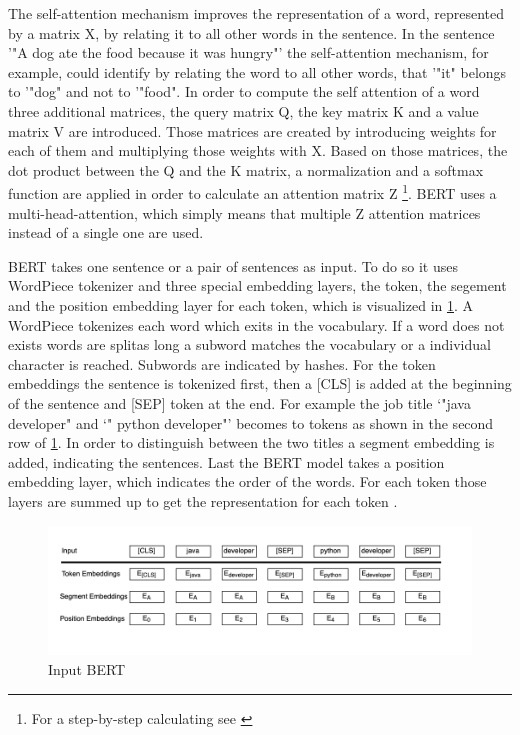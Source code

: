 \documentclass[12pt, a4paper, titlepage]{article}
\begin{document}
The self-attention mechanism improves the representation of a word, represented by a matrix X, by relating it to all other words in the sentence. In the sentence '"A dog ate the food because it was hungry"' \citep[10]{ravichandiran2021} the self-attention mechanism, for example, could identify by relating the word to all other words, that '"it" belongs to '"dog" and not to '"food". 
In order to compute the self attention of a word three additional matrices, the query matrix Q, the key matrix K and a value matrix V are introduced. Those matrices are created by introducing weights for each of them and multiplying those weights with X. Based on those matrices, the dot product between the Q and the K matrix, a normalization and a softmax function are applied in order to calculate an attention matrix Z  \footnote{For a step-by-step calculating see \citep{ravichandiran2021}}. \ac{BERT} uses a multi-head-attention, which simply means that multiple Z attention matrices instead of a single one are used.

\ac{BERT} takes one sentence or a pair of sentences as input. To do so it uses WordPiece tokenizer and three special embedding layers, the token, the segement and the position embedding layer for each token, which is visualized in \ref{fig: F4}. A WordPiece tokenizes each word which exits in the vocabulary. If a word does not exists words are splitas long a subword matches the vocabulary or a individual character is reached. Subwords are indicated by hashes. For the token embeddings the sentence is tokenized first, then a [CLS] is added at the beginning of the sentence and [SEP] token at the end. For example the job title `"java developer" and `" python developer"' becomes to tokens as shown in the second row of \ref{fig: F4}. In order to distinguish between the two titles a segment embedding is added, indicating the sentences. Last the \ac{BERT} model takes a position embedding layer, which indicates the order of the words. For each token those layers are summed up to get the representation for each token \citep{devlin2018,ravichandiran2021}.

\begin{figure}[hb!]
  \center
  \includegraphics[scale=0.5]{BERTInput_own.png}
  \caption{\label{fig: F4} Input \ac{BERT} \citep[5]{devlin2018}}
\end{figure}
\end{document}
